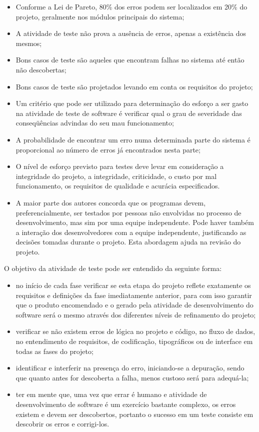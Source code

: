 \begin{itemize}
\item Conforme a Lei de Pareto, 80\% dos erros podem ser localizados em 20\% do projeto, geralmente nos módulos principais do sistema;

\item A atividade de teste não prova a ausência de erros, apenas a existência dos mesmos;
\item Bons casos de teste são aqueles que encontram falhas no sistema até então não descobertas;
\item Bons casos de teste são projetados levando em conta os requisitos do projeto;
\item Um critério que pode ser utilizado para determinação do esforço a ser gasto na atividade de teste de software é verificar qual o grau de severidade das conseqüências advindas do seu mau funcionamento;
\item A probabilidade de encontrar um erro numa determinada parte do sistema é proporcional ao número de erros já encontrados nesta parte;
\item O nível de esforço previsto para testes deve levar em consideração a integridade do projeto, a integridade, criticidade, o custo por mal funcionamento, os requisitos de qualidade e acurácia especificados.
\item A maior parte dos autores concorda que os programas devem, preferencialmente, ser testados por pessoas não envolvidas no processo de desenvolvimento, mas sim por uma equipe independente. Pode haver também a interação dos desenvolvedores com a equipe independente, justificando as decisões tomadas durante o projeto. Esta abordagem ajuda na revisão do projeto.

\end{itemize}

O objetivo da atividade de teste pode ser entendido da seguinte forma:

\begin{itemize}
\item no início de cada fase verificar se esta etapa do projeto reflete exatamente os requisitos e definições da fase imediatamente anterior, para com isso garantir que o produto encomendado e o gerado pela atividade de desenvolvimento do software será o mesmo através dos diferentes níveis de refinamento do projeto;
\item verificar se não existem erros de lógica no projeto e código, no fluxo de dados, no entendimento de requisitos, de codificação, tipográficos ou de interface em todas as fases do projeto;
\item identificar e interferir na presença do erro, iniciando-se a depuração, sendo que quanto antes for descoberta a falha, menos custoso será para adequá-la;
\item ter em mente que, uma vez que errar é humano e atividade de desenvolvimento de software é um exercício bastante complexo, os erros existem e devem ser descobertos, portanto o sucesso em um teste consiste em descobrir os erros e corrigi-los.
\end{itemize}

